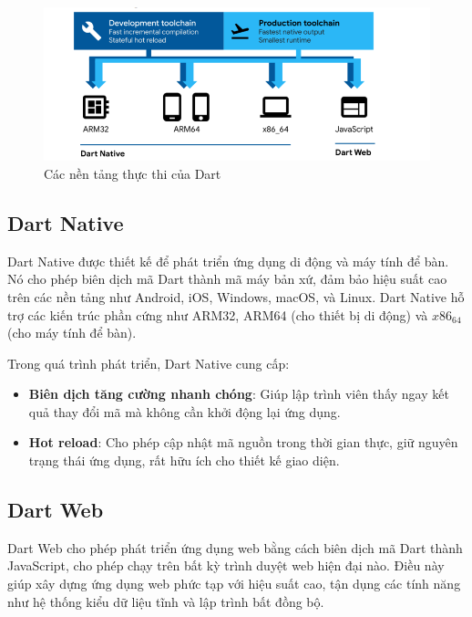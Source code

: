 \documentclass[../DoAn.tex]{subfiles}
\numberwithin{figure}{chapter}
\begin{document}
\begin{figure}[H]
    \centering
    \includegraphics[width=1\textwidth]{Hinhve/dartPlatform.png}
    \caption{Các nền tảng thực thi của Dart}
    \label{fig:dart_platforms}
\end{figure}

\subsection{Dart Native}

Dart Native được thiết kế để phát triển ứng dụng di động và máy tính để bàn. Nó cho phép biên dịch mã Dart thành mã máy bản xứ, đảm bảo hiệu suất cao trên các nền tảng như Android, iOS, Windows, macOS, và Linux. Dart Native hỗ trợ các kiến trúc phần cứng như ARM32, ARM64 (cho thiết bị di động) và $x86_64$ (cho máy tính để bàn).

Trong quá trình phát triển, Dart Native cung cấp:
\begin{itemize}
    \item \textbf{Biên dịch tăng cường nhanh chóng}: Giúp lập trình viên thấy ngay kết quả thay đổi mã mà không cần khởi động lại ứng dụng.
    \item \textbf{Hot reload}: Cho phép cập nhật mã nguồn trong thời gian thực, giữ nguyên trạng thái ứng dụng, rất hữu ích cho thiết kế giao diện.
\end{itemize}



\subsection{Dart Web}

Dart Web cho phép phát triển ứng dụng web bằng cách biên dịch mã Dart thành JavaScript, cho phép chạy trên bất kỳ trình duyệt web hiện đại nào. Điều này giúp xây dựng ứng dụng web phức tạp với hiệu suất cao, tận dụng các tính năng như hệ thống kiểu dữ liệu tĩnh và lập trình bất đồng bộ.
\end{document}
